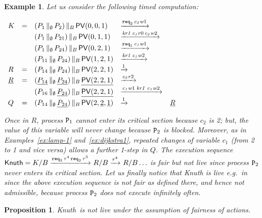 \documentclass[copyright,creativecommons]{eptcs}
\newtheorem{proposition}[theorem]{Proposition}
\newtheorem{example}[theorem]{Example}
\newcommand{\nar}[2]{\xrightarrow{#1}_{#2}}
\newcommand{\rk}[1]{{\it kr #1}}
\newcommand{\rc}[1]{{\it c_{#1}r}}
\newcommand{\wc}[1]{{\it c_{#1}w}}
\newcommand{\vp}{{\sf PV}}
\newcommand{\req}{{\tt req}}
\newcommand{\knutha}{{\sf Knuth}} \newcommand{\knuthb}{\knutha}
\newcommand{\proc}{{\tt P}}
\newcommand{\ppath}[5]{#1 & #2 & #3 & #4 & #5}
\begin{document}
\begin{example}\rm\label{ex:knuth}
Let us consider the following timed computation:

$\begin{array}{l l l l l}
\ppath{K}{=}{(P_1 \,\|_\emptyset\, P_2)  \,\|_B\, \vp(0,0,1)}{\nar{ \req_2 \, \wc{2}1 }{}}{}\\
\ppath{}{}{(P_1 \,\|_\emptyset\, P_{21})  \,\|_B\, \vp(0,1,1)}{\nar{ \rk{1} \, \rc{1}0 \, \wc{2}2 }{}}{}\\
\ppath{}{}{(P_1 \,\|_\emptyset\, P_{24})  \,\|_B\, \vp(0,2,1)}{\nar{ \req_1 \, \wc{1}1 }{}}{}\\
\ppath{}{}{(P_{11} \,\|_\emptyset\, P_{24})  \,\|_B\, \vp(1,2,1)}{\nar{ \rk{1} \, \wc{1}2 }{}}{}\\


\ppath{R}{=}{(P_{14} \,\|_\emptyset\, P_{24})  \,\|_B\, \vp(2,2,1)}{\nar{ 1 }{}}{}\\
\ppath{\underline{R}}{=}{(\underline{P_{14}} \,\|_\emptyset\,
\underline{P_{24}}) 
\,\|_B\, \underline{\vp(2,2,1)}}{\nar{ \rc{2}2 }{}}{}\\
\ppath{}{}{(P_{16} \,\|_\emptyset\, \underline{P_{24}}) 
\,\|_B\, \underline{\vp(2,2,1)}}{\nar{ \wc{1}1 \; \rk{1} \; \wc{1}2
}{}}{}\\
\ppath{Q}{=}{(P_{14} \,\|_\emptyset\, \underline{P_{24}}) 
\,\|_B\, \vp(2,\underline{2},\underline{1})}{\nar{ 1 }{}}{\underline{R}} 
\end{array}$

\vspace{0.15cm}

\noindent Once in $R$, process $\proc_1$ cannot enter its critical section
because $c_2$ is 2; but, the value of this variable will
never change because $\proc_2$ is blocked. Moreover, as in
Examples~\ref{ex:lamp-1} and~\ref{ex:dijkstra1}, repeated changes of
variable $c_1$ (from 2 to 1 and vice versa) allows a further 1-step in
$Q$.
The execution sequence $\knutha = K/B \nar{\req_2 \, \tau^4 \, \req_2 \,
\tau^3}{} R/B  \nar{ \tau^4 }{} R /B \ldots$ is fair but not live since
process $\proc_2$ never enters its critical section. Let us finally notice
that Knuth is live e.g.\ in~\cite{Bogunovic03} since the above execution
sequence is not fair as defined there, and hence not admissible, because
process $\proc_2$ does not execute infinitely often. 
\end{example}
\begin{proposition}\label{prop:knuth}
\knutha\ is not live under the assumption of fairness of actions.
\end{proposition}
\end{document}
